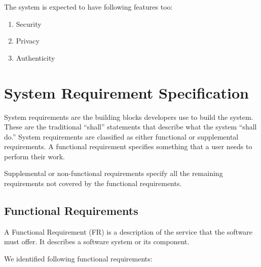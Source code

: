 The system is expected to have following features too:
\begin{enumerate}
 \item Security
 \item Privacy
 \item Authenticity
\end{enumerate}


\section{System Requirement Specification}
System requirements are the building blocks developers use to build the system. These are the traditional “shall” statements that describe what the system “shall do.” System requirements are classified as either functional or supplemental requirements. A functional requirement specifies something that a user needs to perform their work.

Supplemental or non-functional requirements specify all the remaining requirements not covered by the functional requirements.

\subsection{Functional Requirements}
A Functional Requirement (FR) is a description of the service that the software must offer. It describes a software system or its component.

We identified following functional requirements:

